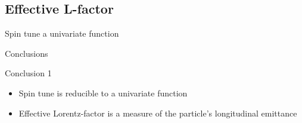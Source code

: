 \documentclass[14pt]{beamer}
\newcommand{\gef}{\gamma_{eff}}
\begin{document}
\subsection{Effective L-factor}
\begin{frame}{Spin tune a univariate function}
	\hspace*{-2cm}
\end{frame}
\begin{frame}{Conclusions}
	\begin{block}{Conclusion 1}
	\begin{itemize}
		\item Spin tune is reducible to a univariate function
		\item Effective Lorentz-factor is a measure of the particle's longitudinal emittance
	\end{itemize}
	\end{block}
\end{frame}
\end{document}
